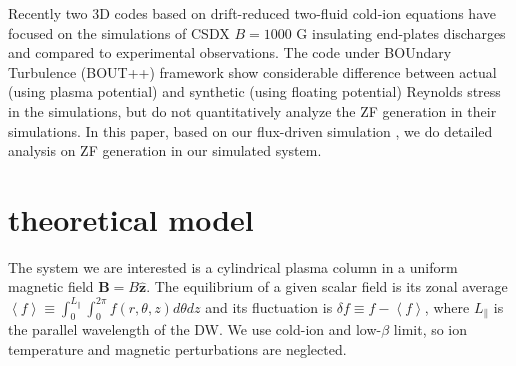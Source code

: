 \documentclass[aps,pre,twocolumn,superscriptaddress]{revtex4-2}
\begin{document}
Recently two 3D codes based on drift-reduced two-fluid cold-ion equations have focused on the simulations of CSDX $B=1000$ G insulating end-plates discharges \cite{Vaezi_2017V, Lang_2019} and compared to experimental observations. The code under BOUndary Turbulence (BOUT++) framework \cite{Vaezi_2017V} show considerable difference between actual (using plasma potential) and synthetic (using floating potential) Reynolds stress in the simulations, but do not quantitatively analyze the ZF generation in their simulations. In this paper, based on our flux-driven simulation \cite{Lang_2019}, we do detailed analysis on ZF generation in our simulated system.  

\section{\label{sec:theoretical model}theoretical model}
The system we are interested is a cylindrical plasma column in a uniform magnetic field $\bm{B}=B\hat{\bm{z}}$. The equilibrium of a given scalar field is its zonal average $\left<f\right>\equiv\int_{0}^{L_{\parallel}}\int_{0}^{2\pi}f \left(r,\theta,z\right)d\theta dz$ and its fluctuation is $\delta f\equiv f-\left<f\right>$, where $L_{\parallel}$ is the parallel wavelength of the DW. We use cold-ion and low-$\beta$ limit, so ion temperature and magnetic perturbations are neglected.
\end{document}

